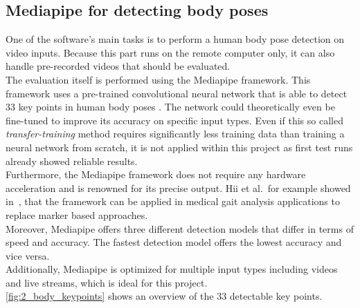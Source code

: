 \subsection{Mediapipe for detecting body poses}\label{subsec:2_mediapipe_framework}
One of the software's main tasks is to perform a human body pose detection on
video inputs.
Because this part runs on the remote computer only, it can also handle
pre-recorded videos that should be evaluated.\\
The evaluation itself is performed using the Mediapipe framework.
This framework uses a pre-trained convolutional neural network that is able to
detect 33 key points in human body poses \cite{mediapipe_paper}.
The network could theoretically even be fine-tuned to improve its accuracy on
specific input types.
Even if this so called \textit{transfer-training} method requires significantly
less training data than training a neural network from scratch, it is not applied
within this project as first test runs already showed reliable results.\\
Furthermore, the Mediapipe framework does not require any hardware acceleration
and is renowned for its precise output.
Hii et al.~for example showed in~\cite{mp_gait_analysis}, 
\cite{mp_gait_analysis_2} that the framework can be applied in medical gait 
analysis applications to replace marker based approaches.\\
Moreover, Mediapipe offers three different detection models that differ in 
terms of speed and accuracy.
The fastest detection model offers the lowest accuracy and vice versa.\\
Additionally, Mediapipe is optimized for multiple input types including videos 
and live streams, which is ideal for this project.\\
\autoref{fig:2_body_keypoints} shows an overview of the 33 detectable key 
points. 

